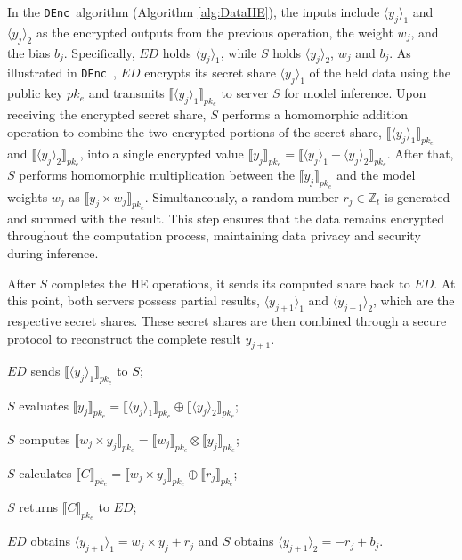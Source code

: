 \documentclass[conference]{IEEEtran}
\newcommand{\DEnc}{\texttt{DEnc}}
\begin{document}
In the \DEnc~algorithm (Algorithm \ref{alg:DataHE}), the inputs include $\langle y_j\rangle_1$ and $\langle  y_j\rangle_2$ as the encrypted outputs from the previous operation, the weight $w_j$, and the bias $b_j$. Specifically, $ED$ holds $\langle y_j\rangle_1$, while $S$ holds $\langle y_j\rangle_2$, $w_j$ and $b_j$. As illustrated in \DEnc~, $ED$ encrypts its secret share $\langle y_j \rangle_1$ of the held data using the public key $pk_e$ and transmits $\llbracket\langle y_j \rangle_1\rrbracket_{pk_e}$ to server $S$ for model inference. Upon receiving the encrypted secret share, $S$ performs a homomorphic addition operation to combine the two encrypted portions of the secret share, $\llbracket\langle y_j \rangle_1\rrbracket_{pk_e}$ and $\llbracket\langle y_j \rangle_2\rrbracket_{pk_e}$, into a single encrypted value $\llbracket y_j \rrbracket_{pk_e}=\llbracket \langle y_j \rangle_1 +  \langle y_j \rangle_2\rrbracket_{pk_e}$. After that, $S$ performs homomorphic multiplication between the $\llbracket y_j \rrbracket_{pk_e}$ and the model weights $w_j$ as $\llbracket y_j\times w_j \rrbracket_{pk_e}$. Simultaneously, a random number $r_j \in \mathbb{Z}_t$ is generated and summed with the result. This step ensures that the data remains encrypted throughout the computation process, maintaining data privacy and security during inference.
 
After $S$ completes the HE operations, it sends its computed share back to $ED$. At this point, both servers possess partial results, $\langle y_{j+1} \rangle_1$ and $\langle y_{j+1} \rangle_2$, which are the respective secret shares. These secret shares are then combined through a secure protocol to reconstruct the complete result $y_{j+1}$.
\begin{algorithm}[htbp]
	\caption{\DEnc$(\langle y_j \rangle_1,\langle y_j \rangle_2,w_{j},b_{j}) \rightarrow (\langle y_{j+1}\rangle_1,\langle y_{j+1}\rangle_2)$\!\!\!\!\!}
    \label{alg:DataHE}
    \LinesNumbered
    $ED$ sends $\llbracket\langle y_j \rangle_1\rrbracket_{pk_e}$ to $S$;
    
    $S$ evaluates $\llbracket y_j \rrbracket_{pk_e} = \llbracket \langle y_j \rangle_1 \rrbracket_{pk_e}  \oplus  \llbracket\langle y_j\rangle_2\rrbracket_{pk_e}$;
    
    $S$ computes $\llbracket w_{j} \times y_j \rrbracket_{pk_e} = \llbracket w_{j} \rrbracket_{pk_e} \otimes \llbracket  y_{j} \rrbracket_{pk_e}$;
    
    $S$ calculates $\llbracket C \rrbracket_{pk_e} = \llbracket w_{j} \times y_{j} \rrbracket_{pk_e} \oplus \llbracket r_{j} \rrbracket_{pk_e}$;
    
    $S$ returns $\llbracket C \rrbracket_{pk_e}$ to $ED$;
    
    $ED$ obtains $\langle y_{j+1}\rangle_1=w_{j} \times y_{j}+r_{j}$ and $S$ obtains $\langle y_{j+1} \rangle_2 = -r_j+b_j$.
\end{algorithm}
\end{document}
